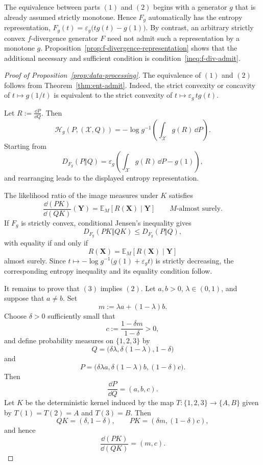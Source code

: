 \documentclass[reqno]{amsart}
\begin{document}
\begin{remark}
The equivalence between parts $(1)$ and $(2)$ begins with a generator
$g$ that is already assumed strictly monotone. Hence
$F_g$ automatically has the entropy representation,
$F_g(t)
=
\varepsilon_g\bigl(tg(t)-g(1)\bigr)$.
By contrast, an arbitrary strictly convex $f$-divergence generator
$F$ need not admit such a representation by a monotone $g$.
Proposition~\ref{prop:f-divergence-representation} shows that the
additional necessary and sufficient condition is  condition~\eqref{ineq:f-div-admit}.
\end{remark}



\begin{proof}[Proof of Proposition~\ref{prop:data-processing}]
The equivalence of $(1)$ and $(2)$ follows from
Theorem~\ref{thm:ent-admit}. Indeed, the strict convexity or concavity of
$t\mapsto g(1/t)$ is equivalent
to the strict convexity of
$t\mapsto \varepsilon_g\,tg(t)$.

Let $R:=\frac{\dd P}{\dd Q}$. 
Then 
$$
\mathcal H_g(P,(\mathcal X,Q))
=
-\log g^{-1}
\left( \int_{\mathcal X}g(R)\,\dd P
\right).
$$
Starting from
$$
D_{F_g}(P\Vert Q)
=
\varepsilon_g
\left(
\int_{\mathcal X}g(R)\,\dd P-g(1)
\right),
$$
and rearranging leads to the displayed entropy representation.


The likelihood ratio of the image measures under $K$ satisfies
$$
\frac{\dd (PK)}{\dd (QK)}(\mathbf{Y})
=
\mathbb E_{M}[R(\mathbf{X})\mid \mathbf{Y}] 
\qquad M\text{-almost surely}.
$$
If $F_g$ is strictly convex, conditional Jensen's inequality gives
$$
D_{F_g}(PK\Vert QK)
\leq
D_{F_g}(P\Vert Q),
$$
with equality if and only if
$$
R(\mathbf{X})=\mathbb E_{M}[R(\mathbf{X})\mid \mathbf{Y}]
$$
almost surely. Since $t \mapsto
-\log g^{-1}\bigl(g(1)+\varepsilon_g t\bigr)$ is strictly decreasing, the corresponding entropy inequality and its
equality condition follow.

It remains to prove that $(3)$ implies $(2)$. Let $a,b>0$,
$\lambda\in(0,1)$, and suppose that $a\neq b$. Set
$$
m:=\lambda a+(1-\lambda)b.
$$
Choose $\delta>0$ sufficiently small that
$$
c:=\frac{1-\delta m}{1-\delta}>0,
$$
and define probability measures on $\{1,2,3\}$ by
$$
Q=
\bigl(\delta \lambda,\delta(1-\lambda),1-\delta\bigr)
$$
and
$$
P=
\bigl(\delta\lambda a,\delta(1-\lambda)b,(1-\delta)c\bigr).
$$
Then
$$
\frac{\dd P}{\dd Q}=(a,b,c).
$$
Let $K$ be the deterministic kernel induced by the map
$T:\{1,2,3\}\to\{A,B\}$ given by
$T(1)=T(2)=A$ and $T(3)=B$. Then
$$
QK=(\delta,1-\delta),
\qquad
PK=(\delta m,(1-\delta)c),
$$
and hence
$$
\frac{\dd(PK)}{\dd(QK)}=(m,c).
$$


\end{proof}
\end{document}

